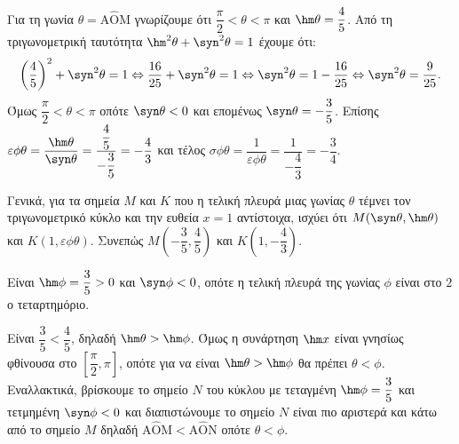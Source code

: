 \begin{alist}
\item Για τη γωνία $\theta = \text{A}\hat{\text{O}}\text{M}$ γνωρίζουμε ότι $\dfrac{\pi}{2} < \theta < \pi$ και $\hm \theta = \dfrac{4}{5}$. Από τη τριγωνομετρική ταυτότητα $\hm ^2\theta + \syn ^2\theta = 1$ έχουμε ότι:
\[\left(\dfrac{4}{5}\right)^2 + \syn ^2\theta = 1 \Leftrightarrow \dfrac{16}{25} + \syn ^2\theta = 1 \Leftrightarrow \syn ^2\theta = 1 - \dfrac{16}{25} \Leftrightarrow \syn ^2\theta = \dfrac{9}{25}.\]
Όμως $\dfrac{\pi}{2} < \theta < \pi$ οπότε $\syn \theta < 0$ και επομένως $\syn \theta = -\dfrac{3}{5}$.
Επίσης $\varepsilon\phi\theta = \dfrac{\hm \theta}{\syn \theta} = \dfrac{\dfrac{4}{5}}{-\dfrac{3}{5}} = -\dfrac{4}{3}$ και τέλος $\sigma\phi\theta = \dfrac{1}{\varepsilon\phi\theta} = \dfrac{1}{-\dfrac{4}{3}} = -\dfrac{3}{4}$.
\item Γενικά, για τα σημεία $M$ και $K$ που η τελική πλευρά μιας γωνίας $\theta$ τέμνει τον τριγωνομετρικό κύκλο και την ευθεία $x = 1$ αντίστοιχα, ισχύει ότι $M(\syn \theta, \hm \theta)$ και $K(1, \varepsilon\phi\theta)$. Συνεπώς $M\left(-\dfrac{3}{5}, \dfrac{4}{5}\right)$ και $K\left(1, -\dfrac{4}{3}\right)$.
\item
\begin{rlist}
\item Είναι $\hm \phi = \dfrac{3}{5} > 0$ και $\syn \phi < 0$, οπότε η τελική πλευρά της γωνίας $\phi$ είναι στο $2$ο τεταρτημόριο.
\item Είναι $\dfrac{3}{5} < \dfrac{4}{5}$, δηλαδή $\hm \theta > \hm \phi$. Όμως η συνάρτηση $\hm  x$ είναι γνησίως φθίνουσα στο $\left[\dfrac{\pi}{2}, \pi\right]$, οπότε για να είναι $\hm \theta > \hm \phi$ θα πρέπει $\theta < \phi$.
Εναλλακτικά, βρίσκουμε το σημείο $N$ του κύκλου με τεταγμένη $\hm \phi = \dfrac{3}{5}$ και τετμημένη $\syn \phi < 0$ και διαπιστώνουμε το σημείο $N$ είναι πιο αριστερά και κάτω από το σημείο $M$ δηλαδή $\text{A}\hat{\text{O}}\text{M} < \text{A}\hat{\text{O}}\text{N}$ οπότε $\theta < \phi$.
\end{rlist}
\end{alist}

